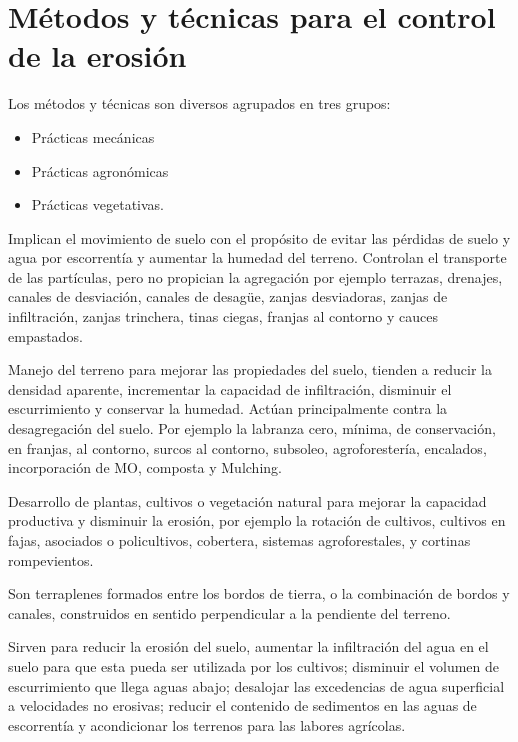     \section{Métodos y técnicas para el control de la erosión}
    Los métodos y técnicas son diversos agrupados en tres grupos:
    \begin{itemize}
        \item Prácticas mecánicas
        \item Prácticas agronómicas
        \item Prácticas vegetativas.
    \end{itemize}
    
    \begin{definition}
        Implican el movimiento de suelo con el propósito de evitar las pérdidas de suelo y agua por escorrentía y aumentar la humedad del terreno. Controlan el transporte de las partículas, pero no propician la agregación por ejemplo terrazas, drenajes, canales de desviación, canales de desagüe, zanjas desviadoras, zanjas de infiltración, zanjas trinchera, tinas ciegas, franjas al contorno y cauces empastados.
    \end{definition}
    
    \begin{definition}
        Manejo del terreno para mejorar las propiedades del suelo, tienden a reducir la densidad aparente, incrementar la capacidad de infiltración, disminuir el escurrimiento y conservar la humedad. Actúan principalmente contra la desagregación del suelo. Por ejemplo la labranza cero, mínima, de conservación, en franjas, al contorno, surcos al contorno, subsoleo, agroforestería, encalados, incorporación de MO, composta y Mulching.
    \end{definition}
    
    \begin{definition}
        Desarrollo de plantas, cultivos o vegetación natural para mejorar la capacidad productiva y disminuir la erosión, por ejemplo la rotación de cultivos, cultivos en fajas, asociados o policultivos, cobertera, sistemas agroforestales, y cortinas rompevientos.
    \end{definition}
    
    \begin{definition}[Terrazas]
        Son terraplenes formados entre los bordos de tierra, o la combinación de bordos y canales, construidos en sentido perpendicular a la pendiente del terreno.
    \end{definition}
    Sirven para reducir la erosión del suelo, aumentar la infiltración del agua en el suelo para que esta pueda ser utilizada por los cultivos; disminuir el volumen de escurrimiento que llega aguas abajo; desalojar las excedencias de agua superficial a velocidades no erosivas; reducir el contenido de sedimentos en las aguas de escorrentía y acondicionar los terrenos para las labores agrícolas.
    
